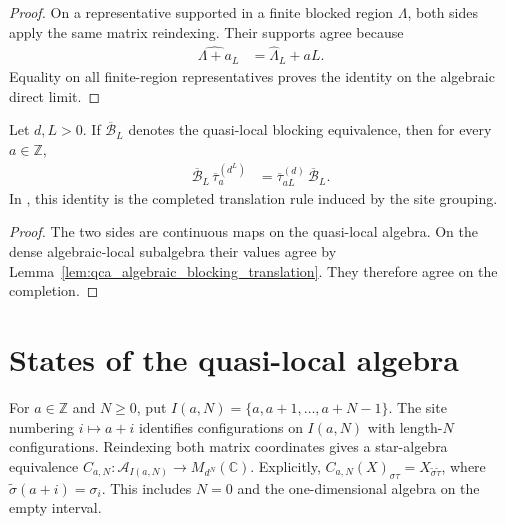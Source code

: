 \begin{proof}\leanok
    On a representative supported in a finite blocked region $\Lambda$, both
    sides apply the same matrix reindexing.  Their supports agree because
    \begin{align}
        \widehat{\Lambda+a}_L
         & =\widehat\Lambda_L+aL.
    \end{align}
    Equality on all finite-region representatives proves the identity on the
    algebraic direct limit.
\end{proof}

\begin{lemma}
    \label{lem:qca_quasi_local_blocking_translation}
    \leanok
    Let $d,L>0$.  If $\overline{\mathcal B}_L$ denotes the quasi-local blocking
    equivalence, then for every $a\in\mathbb Z$,
    \begin{align}
        \overline{\mathcal B}_L\,\overline\tau^{(d^L)}_a
         & =\overline\tau^{(d)}_{aL}\,\overline{\mathcal B}_L.
    \end{align}
    In \cite[lines~2308 and 2313--2320]{Cirac2017MPU}, this identity is the completed translation rule induced by the site
    grouping.
\end{lemma}

\begin{proof}\leanok
    The two sides are continuous maps on the quasi-local algebra.  On the dense
    algebraic-local subalgebra their values agree by
    Lemma~\ref{lem:qca_algebraic_blocking_translation}.  They therefore agree
    on the completion.
\end{proof}

\section{States of the quasi-local algebra}

\begin{definition}
    \label{def:local_interval_coordinates}
    \leanok
    For $a\in\mathbb Z$ and $N\geq0$, put
    $I(a,N)=\{a,a+1,\ldots,a+N-1\}$. The site numbering $i\mapsto a+i$
    identifies configurations on $I(a,N)$ with length-$N$ configurations.
    Reindexing both matrix coordinates gives a star-algebra equivalence
    $C_{a,N}:\mathcal A_{I(a,N)}\to M_{d^N}(\mathbb C)$.
    Explicitly, $C_{a,N}(X)_{\sigma\tau}=X_{\widetilde\sigma\widetilde\tau}$,
    where $\widetilde\sigma(a+i)=\sigma_i$.
    This includes $N=0$ and the one-dimensional algebra on the empty interval.
\end{definition}

